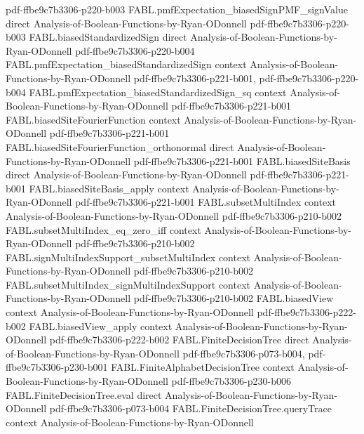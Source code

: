 \begin{theorem}
  {pdf-ffbe9c7b3306-p220-b003}
\proofstep
  {FABL.pmfExpectation_biasedSignPMF_signValue}
  {direct}
  {Analysis-of-Boolean-Functions-by-Ryan-ODonnell}
  {pdf-ffbe9c7b3306-p220-b003}
\proofstep
  {FABL.biasedStandardizedSign}
  {direct}
  {Analysis-of-Boolean-Functions-by-Ryan-ODonnell}
  {pdf-ffbe9c7b3306-p220-b004}
\proofstep
  {FABL.pmfExpectation_biasedStandardizedSign}
  {context}
  {Analysis-of-Boolean-Functions-by-Ryan-ODonnell}
  {pdf-ffbe9c7b3306-p221-b001,
    pdf-ffbe9c7b3306-p220-b004}
\proofstep
  {FABL.pmfExpectation_biasedStandardizedSign_sq}
  {context}
  {Analysis-of-Boolean-Functions-by-Ryan-ODonnell}
  {pdf-ffbe9c7b3306-p221-b001}
\proofstep
  {FABL.biasedSiteFourierFunction}
  {context}
  {Analysis-of-Boolean-Functions-by-Ryan-ODonnell}
  {pdf-ffbe9c7b3306-p221-b001}
\proofstep
  {FABL.biasedSiteFourierFunction_orthonormal}
  {direct}
  {Analysis-of-Boolean-Functions-by-Ryan-ODonnell}
  {pdf-ffbe9c7b3306-p221-b001}
\proofstep
  {FABL.biasedSiteBasis}
  {direct}
  {Analysis-of-Boolean-Functions-by-Ryan-ODonnell}
  {pdf-ffbe9c7b3306-p221-b001}
\proofstep
  {FABL.biasedSiteBasis_apply}
  {context}
  {Analysis-of-Boolean-Functions-by-Ryan-ODonnell}
  {pdf-ffbe9c7b3306-p221-b001}
\proofstep
  {FABL.subsetMultiIndex}
  {context}
  {Analysis-of-Boolean-Functions-by-Ryan-ODonnell}
  {pdf-ffbe9c7b3306-p210-b002}
\proofstep
  {FABL.subsetMultiIndex_eq_zero_iff}
  {context}
  {Analysis-of-Boolean-Functions-by-Ryan-ODonnell}
  {pdf-ffbe9c7b3306-p210-b002}
\proofstep
  {FABL.signMultiIndexSupport_subsetMultiIndex}
  {context}
  {Analysis-of-Boolean-Functions-by-Ryan-ODonnell}
  {pdf-ffbe9c7b3306-p210-b002}
\proofstep
  {FABL.subsetMultiIndex_signMultiIndexSupport}
  {context}
  {Analysis-of-Boolean-Functions-by-Ryan-ODonnell}
  {pdf-ffbe9c7b3306-p210-b002}
\proofstep
  {FABL.biasedView}
  {context}
  {Analysis-of-Boolean-Functions-by-Ryan-ODonnell}
  {pdf-ffbe9c7b3306-p222-b002}
\proofstep
  {FABL.biasedView_apply}
  {context}
  {Analysis-of-Boolean-Functions-by-Ryan-ODonnell}
  {pdf-ffbe9c7b3306-p222-b002}
\proofstep
  {FABL.FiniteDecisionTree}
  {direct}
  {Analysis-of-Boolean-Functions-by-Ryan-ODonnell}
  {pdf-ffbe9c7b3306-p073-b004,
    pdf-ffbe9c7b3306-p230-b001}
\proofstep
  {FABL.FiniteAlphabetDecisionTree}
  {context}
  {Analysis-of-Boolean-Functions-by-Ryan-ODonnell}
  {pdf-ffbe9c7b3306-p230-b006}
\proofstep
  {FABL.FiniteDecisionTree.eval}
  {direct}
  {Analysis-of-Boolean-Functions-by-Ryan-ODonnell}
  {pdf-ffbe9c7b3306-p073-b004}
\proofstep
  {FABL.FiniteDecisionTree.queryTrace}
  {context}
  {Analysis-of-Boolean-Functions-by-Ryan-ODonnell}

\end{theorem}
